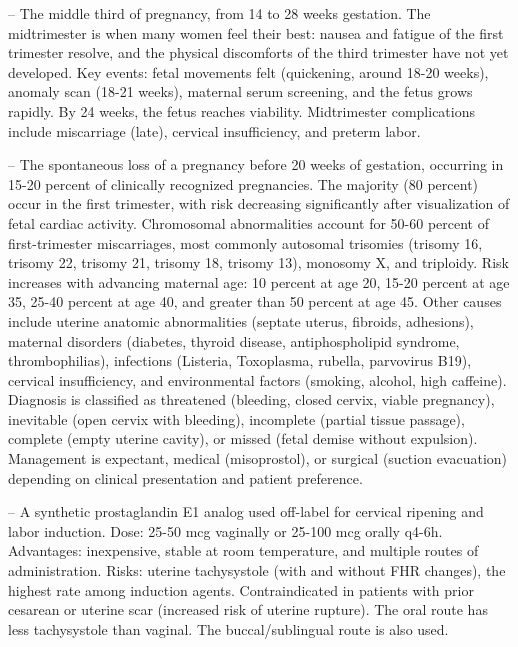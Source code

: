 -- The middle third of pregnancy, from 14 to 28 weeks gestation. The midtrimester is when many women feel their best: nausea and fatigue of the first trimester resolve, and the physical discomforts of the third trimester have not yet developed. Key events: fetal movements felt (quickening, around 18-20 weeks), anomaly scan (18-21 weeks), maternal serum screening, and the fetus grows rapidly. By 24 weeks, the fetus reaches viability. Midtrimester complications include miscarriage (late), cervical insufficiency, and preterm labor.

-- The spontaneous loss of a pregnancy before 20 weeks of gestation, occurring in 15-20 percent of clinically recognized pregnancies. The majority (80 percent) occur in the first trimester, with risk decreasing significantly after visualization of fetal cardiac activity. Chromosomal abnormalities account for 50-60 percent of first-trimester miscarriages, most commonly autosomal trisomies (trisomy 16, trisomy 22, trisomy 21, trisomy 18, trisomy 13), monosomy X, and triploidy. Risk increases with advancing maternal age: 10 percent at age 20, 15-20 percent at age 35, 25-40 percent at age 40, and greater than 50 percent at age 45. Other causes include uterine anatomic abnormalities (septate uterus, fibroids, adhesions), maternal disorders (diabetes, thyroid disease, antiphospholipid syndrome, thrombophilias), infections (Listeria, Toxoplasma, rubella, parvovirus B19), cervical insufficiency, and environmental factors (smoking, alcohol, high caffeine). Diagnosis is classified as threatened (bleeding, closed cervix, viable pregnancy), inevitable (open cervix with bleeding), incomplete (partial tissue passage), complete (empty uterine cavity), or missed (fetal demise without expulsion). Management is expectant, medical (misoprostol), or surgical (suction evacuation) depending on clinical presentation and patient preference.

-- A synthetic prostaglandin E1 analog used off-label for cervical ripening and labor induction. Dose: 25-50 mcg vaginally or 25-100 mcg orally q4-6h. Advantages: inexpensive, stable at room temperature, and multiple routes of administration. Risks: uterine tachysystole (with and without FHR changes), the highest rate among induction agents. Contraindicated in patients with prior cesarean or uterine scar (increased risk of uterine rupture). The oral route has less tachysystole than vaginal. The buccal/sublingual route is also used.


